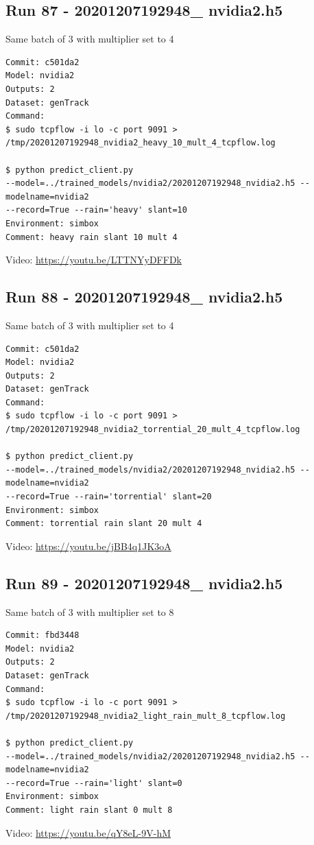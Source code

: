\subsection{Run 87 - 20201207192948\_ nvidia2.h5 }
Same batch of 3 with multiplier set to 4
\label{app_res:87}
\begin{verbatim}
Commit: c501da2
Model: nvidia2 
Outputs: 2
Dataset: genTrack
Command:
$ sudo tcpflow -i lo -c port 9091 > 
/tmp/20201207192948_nvidia2_heavy_10_mult_4_tcpflow.log

$ python predict_client.py
--model=../trained_models/nvidia2/20201207192948_nvidia2.h5 --modelname=nvidia2 
--record=True --rain='heavy' slant=10
Environment: simbox
Comment: heavy rain slant 10 mult 4
\end{verbatim}
Video: \url{https://youtu.be/LTTNYyDFFDk}

\subsection{Run 88 - 20201207192948\_ nvidia2.h5 }
Same batch of 3 with multiplier set to 4
\label{app_res:88}
\begin{verbatim}
Commit: c501da2
Model: nvidia2 
Outputs: 2
Dataset: genTrack
Command:
$ sudo tcpflow -i lo -c port 9091 > 
/tmp/20201207192948_nvidia2_torrential_20_mult_4_tcpflow.log

$ python predict_client.py
--model=../trained_models/nvidia2/20201207192948_nvidia2.h5 --modelname=nvidia2 
--record=True --rain='torrential' slant=20
Environment: simbox
Comment: torrential rain slant 20 mult 4
\end{verbatim}
Video: \url{https://youtu.be/jBB4q1JK3oA}


\subsection{Run 89 - 20201207192948\_ nvidia2.h5 }
Same batch of 3 with multiplier set to 8
\label{app_res:89}
\begin{verbatim}
Commit: fbd3448
Model: nvidia2 
Outputs: 2
Dataset: genTrack
Command:
$ sudo tcpflow -i lo -c port 9091 > 
/tmp/20201207192948_nvidia2_light_rain_mult_8_tcpflow.log

$ python predict_client.py
--model=../trained_models/nvidia2/20201207192948_nvidia2.h5 --modelname=nvidia2 
--record=True --rain='light' slant=0
Environment: simbox
Comment: light rain slant 0 mult 8
\end{verbatim}
Video: \url{https://youtu.be/qY8eL-9V-hM}

